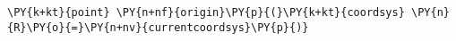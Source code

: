 \begin{Verbatim}[commandchars=\\\{\}]
    \PY{k+kt}{point} \PY{n+nf}{origin}\PY{p}{(}\PY{k+kt}{coordsys} \PY{n}{R}\PY{o}{=}\PY{n+nv}{currentcoordsys}\PY{p}{)}
\end{Verbatim}
